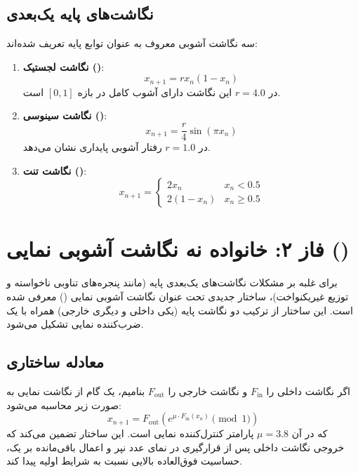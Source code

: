 \subsection{نگاشت‌های پایه یک‌بعدی}
سه نگاشت آشوبی معروف به عنوان توابع پایه تعریف شده‌اند:
\begin{enumerate}
    \item \textbf{نگاشت لجستیک ()}:
    \begin{equation}
    x_{n+1} = r x_n (1 - x_n)
    \end{equation}
    در $r=4.0$ این نگاشت دارای آشوب کامل در بازه $[0, 1]$ است.
    \item \textbf{نگاشت سینوسی ()}:
    \begin{equation}
    x_{n+1} = \frac{r}{4} \sin(\pi x_n)
    \end{equation}
    در $r=1.0$ رفتار آشوبی پایداری نشان می‌دهد.
    \item \textbf{نگاشت تنت ()}:
    \begin{equation}
    x_{n+1} = \begin{cases} 
      2 x_n & x_n < 0.5 \\
      2(1 - x_n) & x_n \ge 0.5 
   \end{cases}
    \end{equation}
\end{enumerate}

\section{فاز ۲: خانواده نه نگاشت آشوبی نمایی ()}
برای غلبه بر مشکلات نگاشت‌های یک‌بعدی پایه (مانند پنجره‌های تناوبی ناخواسته و توزیع غیریکنواخت)، ساختار جدیدی تحت عنوان نگاشت آشوبی نمایی () معرفی شده است. این ساختار از ترکیب دو نگاشت پایه (یکی داخلی و دیگری خارجی) همراه با یک ضرب‌کننده نمایی تشکیل می‌شود. 

\subsection{معادله ساختاری }
اگر نگاشت داخلی را $F_{\mathrm{in}}$ و نگاشت خارجی را $F_{\mathrm{out}}$ بنامیم، یک گام از نگاشت نمایی به صورت زیر محاسبه می‌شود:
\begin{equation}
x_{n+1} = F_{\mathrm{out}} \left( e^{\mu \cdot F_{\mathrm{in}}(x_n)} \pmod 1 \right)
\end{equation}
که در آن $\mu = 3.8$ پارامتر کنترل‌کننده نمایی است. این ساختار تضمین می‌کند که خروجی نگاشت داخلی پس از قرارگیری در نمای عدد نپر و اعمال باقی‌مانده بر یک، حساسیت فوق‌العاده بالایی نسبت به شرایط اولیه پیدا کند.


